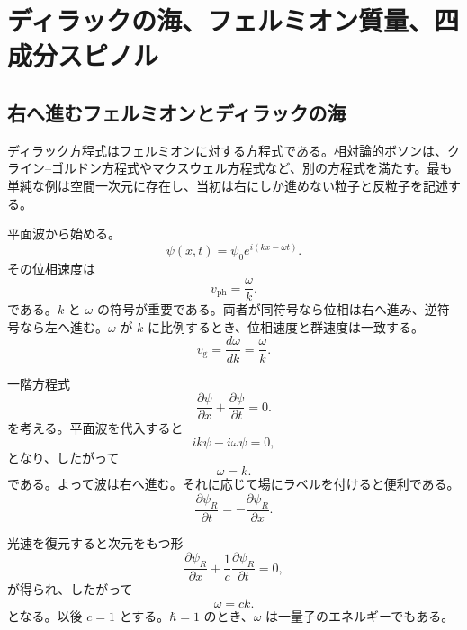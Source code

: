 \chapter{ディラックの海、フェルミオン質量、四成分スピノル}

\section{右へ進むフェルミオンとディラックの海}

ディラック方程式はフェルミオンに対する方程式である。相対論的ボソンは、クライン--ゴルドン方程式やマクスウェル方程式など、別の方程式を満たす。最も単純な例は空間一次元に存在し、当初は右にしか進めない粒子と反粒子を記述する。

平面波から始める。
\begin{equation}
\psi(x,t)=\psi_0 e^{i(kx-\omega t)}.
\end{equation}
その位相速度は
\begin{equation}
v_{\mathrm{ph}}=\frac{\omega}{k}.
\end{equation}
である。\(k\) と \(\omega\) の符号が重要である。両者が同符号なら位相は右へ進み、逆符号なら左へ進む。\(\omega\) が \(k\) に比例するとき、位相速度と群速度は一致する。
\begin{equation}
v_{\mathrm{g}}=\frac{d\omega}{dk}=\frac{\omega}{k}.
\end{equation}

一階方程式
\begin{equation}
\frac{\partial\psi}{\partial x}
+
\frac{\partial\psi}{\partial t}
=0.
\end{equation}
を考える。平面波を代入すると
\begin{equation}
ik\psi-i\omega\psi=0,
\end{equation}
となり、したがって
\begin{equation}
\omega=k.
\end{equation}
である。よって波は右へ進む。それに応じて場にラベルを付けると便利である。
\begin{equation}
\frac{\partial\psi_R}{\partial t}
=
-\frac{\partial\psi_R}{\partial x}.
\end{equation}

光速を復元すると次元をもつ形
\begin{equation}
\frac{\partial\psi_R}{\partial x}
+
\frac{1}{c}\frac{\partial\psi_R}{\partial t}
=0,
\end{equation}
が得られ、したがって
\begin{equation}
\omega=ck.
\end{equation}
となる。以後 \(c=1\) とする。\(\hbar=1\) のとき、\(\omega\) は一量子のエネルギーでもある。

